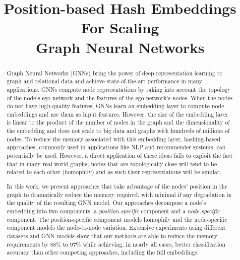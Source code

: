 \documentclass[conference]{IEEEtran}
\begin{document}
\title{Position-based Hash Embeddings For Scaling \\Graph Neural Networks\\
% 
}

\author{
\and
{}
}

\maketitle

\begin{abstract}
Graph Neural Networks (GNNs) bring the power of deep representation learning to graph and relational data and achieve state-of-the-art performance in many applications. GNNs compute node representations by taking into account the topology of the node's ego-network and the features of the ego-network's nodes. When the nodes do not have high-quality features, GNNs learn an embedding layer to compute node embeddings and use them as input features. However, the size of the embedding layer is linear to the product of the number of nodes in the graph and the dimensionality of the embedding
and does not scale to big data and graphs with hundreds of millions of nodes. To reduce the memory associated with this embedding layer, hashing-based approaches, commonly used in applications like NLP and recommender systems, can potentially be used. However, a direct application of these ideas fails to exploit the fact that in many real-world graphs, nodes that are topologically close will tend to be related to each other (homophily) and as such their representations will be similar.

In this work, we present approaches that take advantage of the nodes' position in the graph to dramatically reduce the memory required, with minimal if any degradation in the quality of the resulting GNN model. Our approaches decompose a node's embedding into two components: a \textit{position-specific} component and a \textit{node-specific} component. The position-specific component models homophily and the node-specific component models the node-to-node variation. Extensive experiments using different datasets and GNN models show that our methods are able to reduce the memory requirements by $88\%$ to $97\%$ while achieving, in nearly all cases, better classification accuracy than other competing approaches, including the full embeddings. 
\end{abstract}
\end{document}
